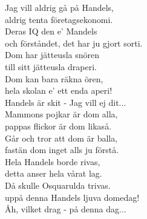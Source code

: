 \documentclass[a6paper,10pt,twoside]{article}
\begin{document}
\noindent
\begin{center}
\end{center}
\begin{lyrics}
Jag vill aldrig gå på Handels,\\
aldrig tenta företagsekonomi.\\
Deras IQ den e' Mandels\\
och förståndet, det har ju gjort sorti.\\
Dom har jätteusla snören\\
till sitt jätteusla draperi.\\
Dom kan bara räkna ören,\\
hela skolan e' ett enda aperi!
\vspace{5pt}\\
Handels är skit - Jag vill ej dit...
\vspace{5pt}\\
Mammons pojkar är dom alla,\\
pappas flickor är dom likaså.\\
Går och tror att dom är balla,\\
fastän dom inget alls ju förstå.\\
Hela Handels borde rivas,\\
detta anser hela vårat lag.\\
Då skulle Osquarulda trivas.\\
uppå denna Handels ljuva domedag!
\vspace{5pt}\\
Åh, vilket drag - på denna dag... 
\end{lyrics}
\end{document}
